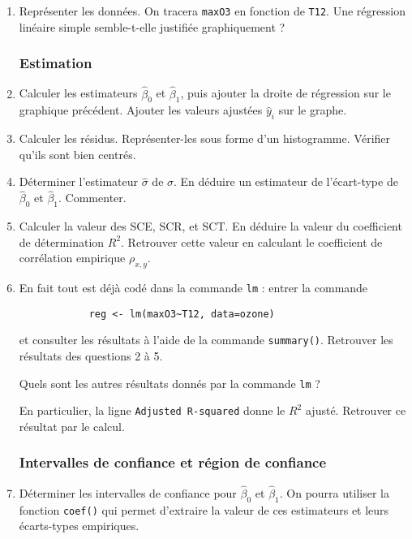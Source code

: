 \documentclass{../../TD/td_um}
\providecommand{\1}{\mathds{1}}
\begin{document}
	
	\begin{enumerate}
		\item Représenter les données. On tracera \texttt{maxO3} en fonction de \texttt{T12}. Une régression linéaire simple semble-t-elle justifiée graphiquement ?
		
	\subsubsection*{Estimation}
		
		\item Calculer les estimateurs $\hat \beta_0$ et $\hat \beta_1$, puis ajouter la droite de régression sur le graphique précédent. Ajouter les valeurs ajustées $\hat y_i$ sur le graphe.
		
		\item Calculer les résidus. Représenter-les sous forme d'un histogramme. Vérifier qu'ils sont bien centrés.
		
		\item Déterminer l'estimateur $\hat \sigma$ de $\sigma$. En déduire un estimateur de l'écart-type de $\hat \beta_0$ et $\hat \beta_1$. Commenter.
		
		\item Calculer la valeur des SCE, SCR, et SCT. En déduire la valeur du coefficient de détermination $R^2$. Retrouver cette valeur en calculant le coefficient de corrélation empirique  $\rho_{x, y}$.
		
		\item En fait tout est déjà codé dans la commande \texttt{lm} : entrer la commande
		\begin{verbatim}
			reg <- lm(maxO3~T12, data=ozone)
		\end{verbatim}
	et consulter les résultats à l'aide de la commande \texttt{summary()}. Retrouver les résultats des questions 2 à 5.
	
	Quels sont les autres résultats donnés par la commande \texttt{lm} ?
	
	En particulier, la ligne \texttt{Adjusted R-squared} donne le $R^2$ ajusté. Retrouver ce résultat par le calcul.
		
	\subsubsection*{Intervalles de confiance et région de confiance}
		\item Déterminer les intervalles de confiance pour $\hat \beta_0$ et $\hat \beta_1$. On pourra utiliser la fonction \texttt{coef()} qui permet d'extraire la valeur de ces estimateurs et leurs écarts-types empiriques.
	

\end{enumerate}
\end{document}
